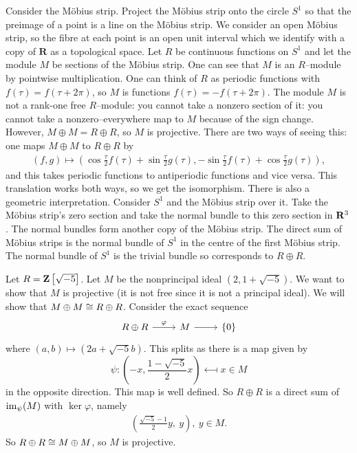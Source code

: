\documentclass[11pt, oneside,margin=1in]{article}
\begin{document}
\begin{example}\label{ms}
Consider the M\"obius strip. Project the M\"obius strip onto the circle $S^1$ so that the preimage of a point is a line on the M\"obius strip. We consider an open M\"obius strip, so the fibre at each point is an open unit interval which we identify with a copy of $\mathbf{R}$ as a topological space. Let $R$ be continuous functions on $S^1$ and let the module $M$ be sections of the M\"obius strip. One can see that $M$ is an $R$--module by pointwise multiplication. One can think of $R$ as periodic functions with $f(\tau) =f(\tau+2\pi)$, so $M$ is functions $f(\tau) =-f(\tau+2\pi)$. The module $M$ is not a rank-one free $R$--module: you cannot take a nonzero section of it: you cannot take a nonzero--everywhere map to $M$ because of the sign change. However, $M\oplus M = R\oplus R$, so $M$ is projective. There are two ways of seeing this: one maps $M\oplus M$ to $R\oplus R$ by \begin{align*}
	(f,g) \longmapsto  \left( \cos\frac{\tau}{2}f(\tau) +\sin\frac{\tau}{2}g(\tau), -\sin\frac{\tau}{2}f(\tau) + \cos\frac{\tau}{2}g(\tau) \right), 
\end{align*}
and this takes periodic functions to antiperiodic functions and vice versa. This translation works both ways, so we get the isomorphism. There is also a geometric interpretation. Consider $S^1$ and the M\"obius strip over it. Take the M\"obius strip's zero section and take the normal bundle to this zero section in $\mathbf R^3$. The normal bundles form another copy of the M\"obius strip. The direct sum of M\"obius strips is the normal bundle of $S^1$ in the centre of the first M\"obius strip. The normal bundle of $S^1$ is the trivial bundle so corresponds to $R\oplus R$. 
\end{example}

\begin{example}\label{npi}
Let $R=\mathbf Z \left[ \sqrt{-5}   \right] $. Let $M$ be the nonprincipal ideal $(2,1+\sqrt{-5}  )$. We want to show that $M$ is projective (it is not free since it is not a principal ideal). We will show that $M\oplus M\cong R\oplus R$. Consider the exact sequence
\[
	\begin{tikzcd}
	R\oplus R \arrow[r,"\varphi"] & M\arrow[r]& \{0\}
	\end{tikzcd}
\]
where $(a,b) \longmapsto(2a+\sqrt{-5} b)$. This splits as there is a map given by $$\psi: \left(-x, \frac{1-\sqrt{-5}}{2}x\right)  \longmapsfrom  x\in M$$ in the opposite direction. This map is well defined. \iffalse as \begin{align*}
	\frac{1-\sqrt{-5} }{2}\cdot 2 = 1-\sqrt{-5}  \in R 
\end{align*}
and \begin{align*}
	\frac{1-\sqrt{-5} }{2}(1+\sqrt{-5} ) =3 \in R.
\end{align*}
\fi So $R\oplus R$ is a direct sum of $\operatorname{im}_\psi(M)$ with $\ker\varphi$, namely \begin{align*}
	\left( \frac{\sqrt{-5} -1}{2}y,\ y \right) ,\ y\in M.
\end{align*}
So $R\oplus R\cong M\oplus M$, so $M$ is projective.
\end{example}
\end{document}
